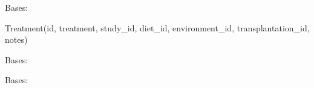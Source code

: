 \documentclass[letterpaper,10pt,english]{sphinxmanual}
\begin{document}
\begin{fulllineitems}
\label{api:mousedb.data.models.Treatment}
Bases: 

Treatment(id, treatment, study\_id, diet\_id, environment\_id, transplantation\_id, notes)


\begin{fulllineitems}
\label{api:mousedb.data.models.Treatment.DoesNotExist}
Bases: 

\end{fulllineitems}



\begin{fulllineitems}
\label{api:mousedb.data.models.Treatment.MultipleObjectsReturned}
Bases: 

\end{fulllineitems}



\begin{fulllineitems}
\label{api:mousedb.data.models.Treatment.animals}
\end{fulllineitems}



\begin{fulllineitems}
\label{api:mousedb.data.models.Treatment.diet}
\end{fulllineitems}



\begin{fulllineitems}
\label{api:mousedb.data.models.Treatment.environment}
\end{fulllineitems}




\end{fulllineitems}
\end{document}
